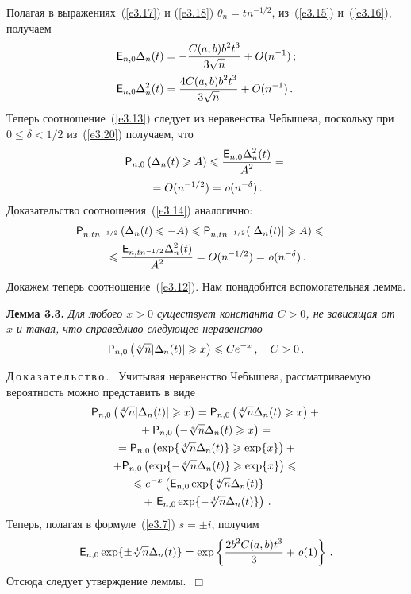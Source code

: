 \begin{multicols}{2}
Полагая в выражениях~(\ref{e3.17}) и (\ref{e3.18})  $\theta_n = tn^{-1/2}$, из~(\ref{e3.15}) 
и~(\ref{e3.16}), получаем
\begin{align}
{{\sf E}}_{n,0} \Delta_n(t)& = -\displaystyle\frac{\displaystyle C(a,b)b^2 t^3\mathstrut}{\displaystyle 3\sqrt{n}\mathstrut}+O(n^{-1})\,; \label{e3.19}\\
{{\sf E}}_{n,0} \Delta_n^2(t) &= \displaystyle\frac{\displaystyle 4C(a,b)b^2 t^3\mathstrut}{\displaystyle 3\sqrt{n}\mathstrut}+ O(n^{-1})\,. \label{e3.20}
\end{align}
Теперь соотношение~(\ref{e3.13}) следует из неравенства Чебышева, поскольку
при $0 \le \delta < 1/2$ из~(\ref{e3.20}) получаем, что
\begin{multline*}
{\p}_{n,0}\left ( \Delta_n(t)\ge  A\right )\le
\fr{{\e}_{n,0}\Delta_n^2(t)}{A^2} ={}\\
{}=
O(n^{-1/2}) ={\it o}(n^{-\delta})\,. %
\end{multline*}
Доказательство соотношения~(\ref{e3.14}) аналогично:
\begin{multline*}
\!\!\!\!\!{{\sf P}}_{n,tn^{-1/2}}\left(\Delta_n(t)\leqslant -A\right)\leqslant
{{\sf P}}_{n,tn^{-1/2}}(|\Delta_n(t)| \geqslant A) \leqslant{}\\
{}
\leqslant \displaystyle\frac{\displaystyle {{\sf E}}_{n,tn^{-1/2}} \Delta_n^2(t)\mathstrut}{\displaystyle A^2\mathstrut}= O(n^{-1/2}) =
{\it o}(n^{-\delta})\,. 
\end{multline*}
Докажем теперь соотношение~(\ref{e3.12}). Нам понадобится вспомогательная лемма.


\smallskip

\noindent
\textbf{Лемма 3.3.} {\it Для любого $x >  0$
существует константа  $C > 0$,  не зависящая от~$x$  и такая, что
справедливо следующее неравенство
$$
{{\sf P}}_{n,0}\left(\sqrt[{4}]{n} |\Delta_n(t)| \geqslant x\right) \leqslant 
C e^{-x}\,, \quad C > 0\,.
$$
}

\vspace*{-8pt}

\noindent
Д\,о\,к\,а\,з\,а\,т\,е\,л\,ь\,с\,т\,в\,о\,. \ 
Учитывая неравенство Чебышева, рассматриваемую вероятность можно
представить в виде
\begin{multline*}
{{\sf P}}_{n,0}\left(\sqrt[{4}]{n} |\Delta_n(t)| \geqslant x  \right)=
{{\sf P}}_{n,0}\left(\sqrt[{4}]{n} \Delta_n(t)\geqslant x\right)+{}\\
{}
+{{\sf P}}_{n,0}\left(-\sqrt[{4}]{n} \Delta_n(t) \geqslant x\right) ={}\\
{}=
{{\sf P}}_{n,0}\left(\exp\{\sqrt[{4}]{n}\Delta_n(t)\} \geqslant \exp\{x\}
\right)+{}\\
+{{\sf P}}_{n,0}\left(\exp\{-\sqrt[{4}]{n}\Delta_n(t)\} \geqslant \exp\{x\}
\right )\leqslant{}\\
\leqslant e^{-x}\left({{\sf E}}_{n,0}\exp\{\sqrt[{4}]{n}\Delta_n(t)\}+{}\right.\\
{}+\left.
{{\sf E}}_{n,0}\exp\{-\sqrt[{4}]{n}\Delta_n(t)\}\right)\,.
\end{multline*}
Теперь, полагая в формуле~(\ref{e3.7}) $s = \pm i$,  получим
$$
{{\sf E}}_{n,0}\exp\{\pm\sqrt[{4}]{n}\Delta_n(t)\}=
\exp\left\{\displaystyle\frac{\displaystyle 2b^2 C(a,b)t^3\mathstrut}{\displaystyle 3\mathstrut}+{\it o}(1)\right\}\,.
$$
Отсюда следует утверждение лем\-мы.~$\Box$
\pagebreak


\end{multicols}
